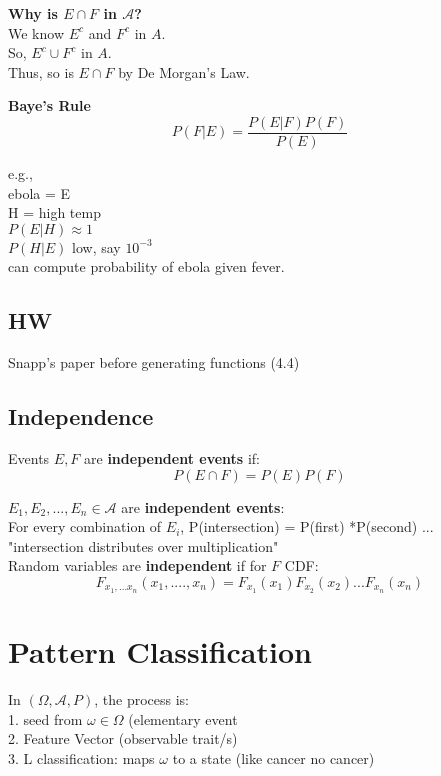 \documentclass[12pt]{article}
\begin{document}
\noindent \textbf{Why is $E \cap F$ in $\mathcal{A}$?}\\
\textcolor[gray]{0.5}{
We know $E^c$ and $F^c$ in $A$. \\
So, $E^c \cup F^c$ in $A$. \\
Thus, so is $E \cap F$ by De Morgan's Law.\\
}

\textbf{Baye's Rule}
$$P(F | E) = \frac{P(E | F) P(F)}{P(E)}$$

\noindent e.g., \\
ebola = E\\
H = high temp\\

$P(E | H) \approx 1$\\
$P(H|E)$ low, say $10^{-3}$\\

can compute probability of ebola given fever.

\subsection*{HW}
Snapp's paper before generating functions (4.4)

\subsection*{Independence}

Events $E, F$ are \textbf{independent events} if:
$$P(E \cap F) = P(E) P(F)$$

$E_1, E_2, ..., E_n \in \mathcal{A}$ are \textbf{independent events}:\\
For every combination of $E_i$, P(intersection) = P(first) *P(second) ...\\
"intersection distributes over multiplication"\\


Random variables are \textbf{independent} if for $F$ CDF:
$$F_{x_1, ... x_n}(x_1, ...., x_n) = F_{x_1}(x_1) F_{x_2}(x_2) ...F_{x_n}(x_n)$$


\section*{Pattern Classification}
In $(\Omega, \mathcal{A}, P)$, the process is: \\
1. seed from $\omega \in \Omega$ (elementary event\\
2. Feature Vector (observable trait/s)\\
3. L classification: maps $\omega$ to a state (like cancer no cancer)\\
\end{document}
